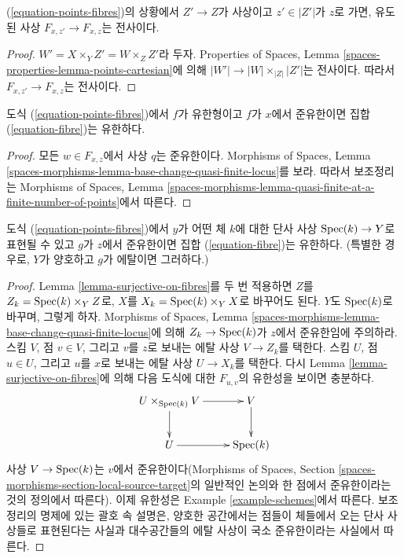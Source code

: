 \begin{lemma}
\label{lemma-surjective-on-fibres}
(\ref{equation-points-fibres})의 상황에서 $Z' \to Z$가 사상이고
$z' \in |Z'|$가 $z$로 가면, 유도된 사상
$F_{x, z'} \to F_{x, z}$는 전사이다.
\end{lemma}

\begin{proof}
$W' = X \times_Y Z' = W \times_Z Z'$라 두자. Properties of Spaces,
Lemma \ref{spaces-properties-lemma-points-cartesian}에 의해
$|W'| \to |W| \times_{|Z|} |Z'|$는 전사이다.
따라서 $F_{x, z'} \to F_{x, z}$는 전사이다.
\end{proof}

\begin{lemma}
\label{lemma-qf-and-qc-finite-fibre}
도식 (\ref{equation-points-fibres})에서 $f$가 유한형이고 $f$가 $x$에서
준유한이면 집합 (\ref{equation-fibre})는 유한하다.
\end{lemma}

\begin{proof}
모든 $w \in F_{x, z}$에서 사상 $q$는 준유한이다. Morphisms of Spaces,
Lemma \ref{spaces-morphisms-lemma-base-change-quasi-finite-locus}를 보라.
따라서 보조정리는 Morphisms of Spaces, Lemma
\ref{spaces-morphisms-lemma-quasi-finite-at-a-finite-number-of-points}에서
따른다.
\end{proof}

\begin{lemma}
\label{lemma-decent-finite-fibre}
도식 (\ref{equation-points-fibres})에서 $y$가 어떤 체 $k$에 대한 단사
사상 $\mathop{\mathrm{Spec}}(k) \to Y$로 표현될 수 있고 $g$가 $z$에서 준유한이면
집합 (\ref{equation-fibre})는 유한하다.
(특별한 경우로, $Y$가 양호하고 $g$가 에탈이면 그러하다.)
\end{lemma}

\begin{proof}
Lemma \ref{lemma-surjective-on-fibres}를 두 번 적용하면 $Z$를
$Z_k = \mathop{\mathrm{Spec}}(k) \times_Y Z$로, $X$를
$X_k = \mathop{\mathrm{Spec}}(k) \times_Y X$로 바꾸어도 된다. $Y$도
$\mathop{\mathrm{Spec}}(k)$로 바꾸며, 그렇게 하자. Morphisms of Spaces, Lemma
\ref{spaces-morphisms-lemma-base-change-quasi-finite-locus}에 의해
$Z_k \to \mathop{\mathrm{Spec}}(k)$가 $z$에서 준유한임에 주의하라.
스킴 $V$, 점 $v \in V$, 그리고 $v$를 $z$로 보내는 에탈 사상
$V \to Z_k$를 택한다. 스킴 $U$, 점 $u \in U$, 그리고 $u$를 $x$로
보내는 에탈 사상 $U \to X_k$를 택한다. 다시 Lemma
\ref{lemma-surjective-on-fibres}에 의해 다음 도식에 대한 $F_{u, v}$의
유한성을 보이면 충분하다.
$$
\xymatrix{
U \times_{\Spec(k)} V \ar[r] \ar[d] & V \ar[d] \\
U \ar[r] & \Spec(k)
}
$$
사상 $V \to \mathop{\mathrm{Spec}}(k)$는 $v$에서 준유한이다(Morphisms of Spaces,
Section \ref{spaces-morphisms-section-local-source-target}의 일반적인
논의와 한 점에서 준유한이라는 것의 정의에서 따른다).
이제 유한성은 Example \ref{example-schemes}에서 따른다.
보조정리의 명제에 있는 괄호 속 설명은, 양호한 공간에서는 점들이
체들에서 오는 단사 사상들로 표현된다는 사실과 대수공간들의 에탈
사상이 국소 준유한이라는 사실에서 따른다.
\end{proof}

